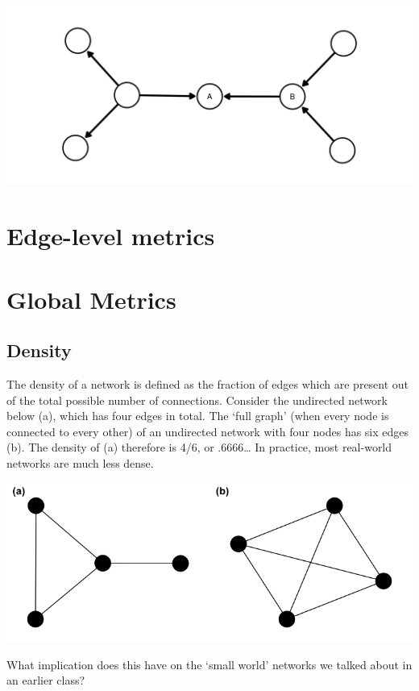 \documentclass[
]{book}
\begin{document}
\includegraphics{images/closeness.png}

\hypertarget{edge-level-metrics}{%
\section{Edge-level metrics}\label{edge-level-metrics}}

\hypertarget{global-metrics}{%
\section{Global Metrics}\label{global-metrics}}

\hypertarget{density}{%
\subsection{Density}\label{density}}

The density of a network is defined as the fraction of edges which are present out of the total possible number of connections. Consider the undirected network below (a), which has four edges in total. The `full graph' (when every node is connected to every other) of an undirected network with four nodes has six edges (b). The density of (a) therefore is 4/6, or .6666\ldots{} In practice, most real-world networks are much less dense.

\includegraphics{images/density.png}

What implication does this have on the `small world' networks we talked about in an earlier class?
\end{document}
